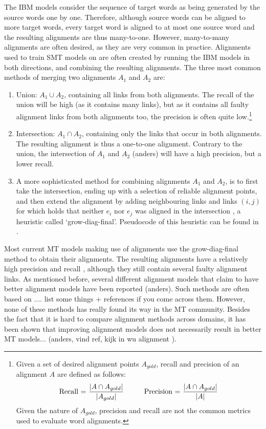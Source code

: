 \documentclass{report}
\theoremstyle{definition}
\theoremstyle{plain}
\begin{document}
The IBM models consider the sequence of target words as being generated by the source words one by one. Therefore, although source words can be aligned to more target words, every target word is aligned to at most one source word and the resulting alignments are thus many-to-one. However, many-to-many alignments are often desired, as they are very common in practice. Alignments used to train SMT models on are often created by running the IBM models in both directions, and combining the resulting alignments. The three most common methods of merging two alignments $A_1$ and $A_2$ are:\begin{enumerate}
\item Union: $A_1\cup A_2$, containing all links from both alignments. The recall of the union will be high (as it contains many links), but as it contains all faulty alignment links from both alignments too, the precision is often quite low.\footnote{Given a set of desired alignment points $A_{gold}$, recall and precision of an alignment $A$ are defined as follows:\\
$$\text{Recall = }\frac{|A \cap A_{gold}|}{|A_{gold}|} \text{\hspace{10mm}Precision = }\frac{|A \cap A_{gold}|}{|A|}$$
Given the nature of $A_{gold}$, precision and recall are not the common metrics used to evaluate word alignments.}
\item Intersection: $A_1\cap A_2$, containing only the links that occur in both alignments. The resulting alignment is thus a one-to-one alignment. Contrary to the union, the intersection of $A_1$ and $A_2$ (anders) will have a high precision, but a lower recall.
\item A more sophisticated method for combining alignments $A_1$ and $A_2$, is to first take the intersection, ending up with a selection of reliable alignment points, and then extend the alignment by adding neighbouring links and links $(i,j)$ for which holds that neither $e_i$ nor $e_j$ was aligned in the intersection \citep{och2000improved}, a heuristic called `grow-diag-final'. Pseudocode of this heuristic can be found in \cite{koehn2008statistical}.
\end{enumerate}

Most current MT models making use of alignments use the grow-diag-final method to obtain their alignments. The resulting alignments have a relatively high precision and recall \citep{och2000improved}, although they still contain several faulty alignment links. As mentioned before, several different alignment models that claim to have better alignment models have been reported (anders). Such methods are often based on .... list some things + references if you come across them. However, none of these methods has really found its way in the MT community. Besides the fact that it is hard to compare alignment methods across domains, it has been shown that improving alignment models does not necessarily result in better MT models... (anders, vind ref, kijk in wu alignment \cite{indurkhya2010handbook}).
\end{document}

